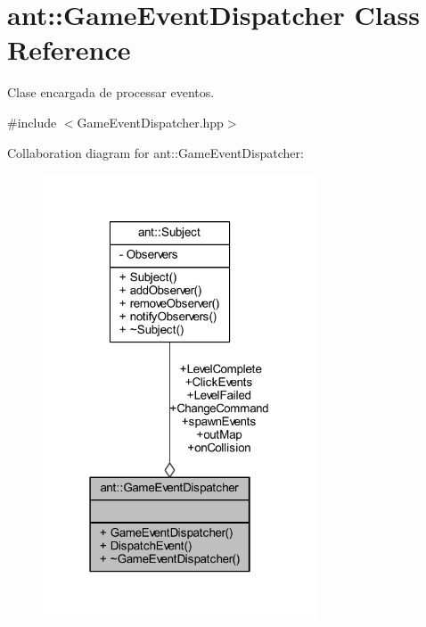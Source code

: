 \hypertarget{classant_1_1_game_event_dispatcher}{\section{ant\+:\+:Game\+Event\+Dispatcher Class Reference}
\label{classant_1_1_game_event_dispatcher}
}


Clase encargada de processar eventos.  




{\ttfamily \#include $<$Game\+Event\+Dispatcher.\+hpp$>$}



Collaboration diagram for ant\+:\+:Game\+Event\+Dispatcher\+:
\nopagebreak
\begin{figure}[H]
\begin{center}
\leavevmode
\includegraphics[width=231pt]{da/da7/classant_1_1_game_event_dispatcher__coll__graph}
\end{center}
\end{figure}
